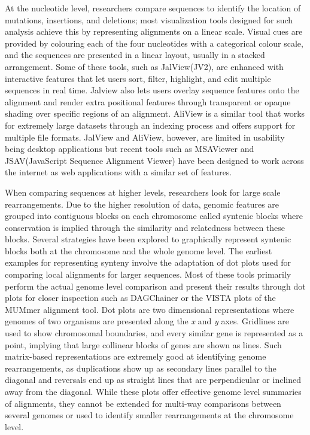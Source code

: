 At the nucleotide level, researchers compare sequences to identify the location of mutations, insertions, and deletions; most visualization tools designed for such analysis achieve this by representing alignments on a linear scale. Visual cues are provided by colouring each of the four nucleotides with a categorical colour scale, and the sequences are presented in a linear layout, usually in a stacked arrangement. Some of these tools, such as JalView(JV2)\cite{waterhouse2009jalview}, are enhanced with interactive features that let users sort, filter, highlight, and edit multiple sequences in real time. Jalview also lets users overlay sequence features onto the alignment and render extra positional features through transparent or opaque shading over specific regions of an alignment. AliView is a similar tool that works for extremely large datasets through an indexing process and offers support for multiple file formats\cite{larsson2014aliview}. JalView and AliView, however, are limited in usability being desktop applications but recent tools such as MSAViewer\cite{yachdav2016msaviewer} and JSAV(JavaScript Sequence Alignment Viewer)\cite{martin2014viewing} have been designed to work across the internet as web applications with a similar set of features.

When comparing sequences at higher levels, researchers look for large scale rearrangements. Due to the higher resolution of data, genomic features are grouped into contiguous blocks on each chromosome called syntenic blocks where conservation is implied through the similarity and relatedness between these blocks.
Several strategies have been explored to graphically represent syntenic blocks both at the chromosome and the whole genome level. The earliest examples for representing synteny involve the adaptation of dot plots used for comparing local alignments for larger sequences. Most of these tools primarily perform the actual genome level comparison and present their results through dot plots for closer inspection such as DAGChainer\cite{haas2004dagchainer} or the VISTA plots of the MUMmer alignment tool\cite{kurtz2004versatile}. Dot plots are two dimensional representations where genomes of two organisms are presented along the \textit{x} and \textit{y} axes. Gridlines are used to show chromosomal boundaries, and every similar gene is represented as a point, implying that large collinear blocks of genes are shown as lines. Such matrix-based representations are extremely good at identifying genome rearrangements, as duplications show up as secondary lines parallel to the diagonal and reversals end up as straight lines that are perpendicular or inclined away from the diagonal. While these plots offer effective genome level summaries of alignments, they cannot be extended for multi-way comparisons between several genomes or used to identify smaller rearrangements at the chromosome level.

